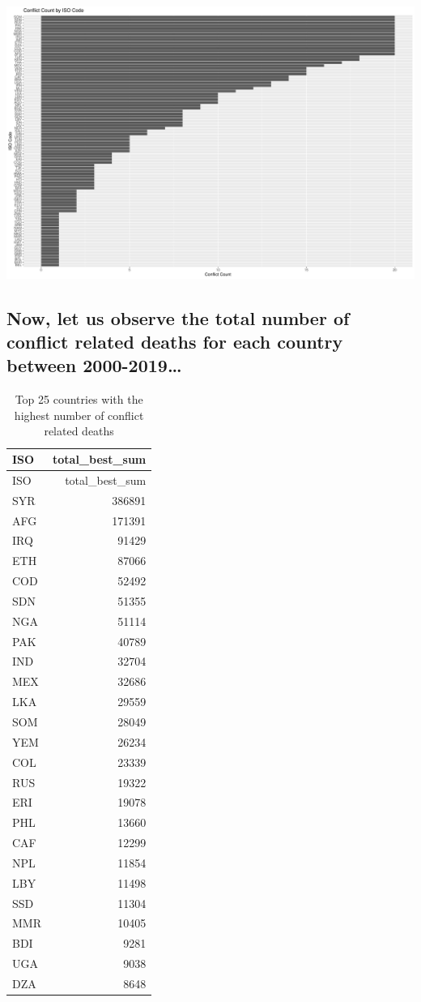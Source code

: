 \documentclass[
  letterpaper,
  DIV=11,
  numbers=noendperiod]{scrartcl}
\begin{document}
\includegraphics{MortalityDescriptives_files/figure-pdf/unnamed-chunk-3-1.pdf}

\subsection{Now, let us observe the total number of conflict related
deaths for each country between
2000-2019\ldots{}}\label{now-let-us-observe-the-total-number-of-conflict-related-deaths-for-each-country-between-2000-2019}

\begin{longtable}[]{@{}lr@{}}
\caption{Top 25 countries with the highest number of conflict related
deaths}\tabularnewline
\toprule\noalign{}
ISO & total\_best\_sum \\
\midrule\noalign{}
\endfirsthead
\toprule\noalign{}
ISO & total\_best\_sum \\
\midrule\noalign{}
\endhead
\bottomrule\noalign{}
\endlastfoot
SYR & 386891 \\
AFG & 171391 \\
IRQ & 91429 \\
ETH & 87066 \\
COD & 52492 \\
SDN & 51355 \\
NGA & 51114 \\
PAK & 40789 \\
IND & 32704 \\
MEX & 32686 \\
LKA & 29559 \\
SOM & 28049 \\
YEM & 26234 \\
COL & 23339 \\
RUS & 19322 \\
ERI & 19078 \\
PHL & 13660 \\
CAF & 12299 \\
NPL & 11854 \\
LBY & 11498 \\
SSD & 11304 \\
MMR & 10405 \\
BDI & 9281 \\
UGA & 9038 \\
DZA & 8648 \\
\end{longtable}
\end{document}
